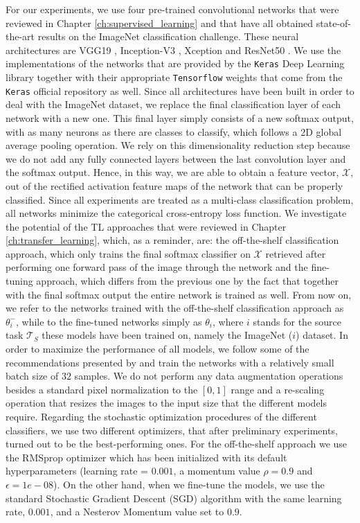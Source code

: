 For our experiments, we use four pre-trained convolutional networks that were reviewed in Chapter \ref{ch:supervised_learning} and that have all obtained state-of-the-art results on the ImageNet classification challenge. These neural architectures are VGG19 \cite{simonyan2014very}, Inception-V3 \cite{szegedy2016rethinking}, Xception \cite{chollet2016xception} and ResNet50 \cite{xie2017aggregated}. We use the implementations of the networks that are provided by the \texttt{Keras} Deep Learning library \cite{chollet2015keras} together with their appropriate \texttt{Tensorflow} weights \cite{abadi2016tensorflow} that come from the \texttt{Keras} official repository as well. Since all architectures have been built in order to deal with the ImageNet dataset, we replace the final classification layer of each network with a new one. This final layer simply consists of a new softmax output, with as many neurons as there are classes to classify, which follows a 2D global average pooling operation. We rely on this dimensionality reduction step because we do not add any fully connected layers between the last convolution layer and the softmax output. Hence, in this way, we are able to obtain a feature vector, $\mathscr{X}$, out of the rectified activation feature maps of the network that can be properly classified. Since all experiments are treated as a multi-class classification problem, all networks minimize the categorical cross-entropy loss function. We investigate the potential of the TL approaches that were reviewed in Chapter \ref{ch:transfer_learning}, which, as a reminder, are: the off-the-shelf classification approach, which only trains the final softmax classifier on $\mathscr{X}$ retrieved after performing one forward pass of the image through the network and the fine-tuning approach, which differs from the previous one by the fact that together with the final softmax output the entire network is trained as well. 
From now on, we refer to the networks trained with the off-the-shelf classification approach as $\theta^{-}_{i}$, while to the fine-tuned networks simply as $\theta_{i}$, where $i$ stands for the source task $\mathcal{T}_S$ these models have been trained on, namely the ImageNet ($i$) dataset. In order to maximize the performance of all models, we follow some of the recommendations presented by \citet{masters2018revisiting} and train the networks with a relatively small batch size of $32$ samples. We do not perform any data augmentation operations besides a standard pixel normalization to the $[0, 1]$ range and a re-scaling operation that resizes the images to the input size that the different models require. Regarding the stochastic optimization procedures of the different classifiers, we use two different optimizers, that after preliminary experiments, turned out to be the best-performing ones. For the off-the-shelf approach we use the RMSprop optimizer \cite{tieleman2012lecture} which has been initialized with its default hyperparameters (learning rate = $0.001$, a momentum value $\rho = 0.9$ and $\epsilon =1e-08$). On the other hand, when we fine-tune the models, we use the standard Stochastic Gradient Descent (SGD) algorithm with the same learning rate, $0.001$, and a Nesterov Momentum value \cite{nesterov1983method} set to $0.9$.
